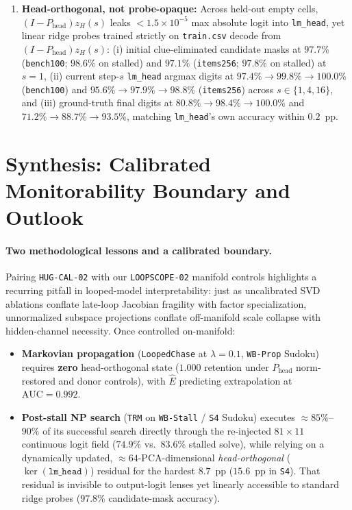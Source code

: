 \documentclass[10pt,letterpaper]{article}
\newcommand{\Phead}{P_{\mathrm{head}}}
\begin{document}
\begin{enumerate}[topsep=3pt,itemsep=2pt]
  \item \textbf{Head-orthogonal, not probe-opaque:} Across held-out empty cells, $(I-\Phead)z_H(s)$ leaks $< 1.5\times 10^{-5}$ max absolute logit into \texttt{lm\_head}, yet linear ridge probes trained strictly on \texttt{train.csv} decode from $(I-\Phead)z_H(s)$: (i) initial clue-eliminated candidate masks at $\mathbf{97.7\%}$ (\texttt{bench100}; $98.6\%$ on stalled) and $\mathbf{97.1\%}$ (\texttt{items256}; $97.8\%$ on stalled) at $s=1$, (ii) current step-$s$ \texttt{lm\_head} argmax digits at $97.4\% \to 99.8\% \to 100.0\%$ (\texttt{bench100}) and $95.6\% \to 97.9\% \to 98.8\%$ (\texttt{items256}) across $s \in \{1, 4, 16\}$, and (iii) ground-truth final digits at $80.8\% \to 98.4\% \to 100.0\%$ and $71.2\% \to 88.7\% \to 93.5\%$, matching \texttt{lm\_head}'s own accuracy within $0.2$~pp.
\end{enumerate}

\section{Synthesis: Calibrated Monitorability Boundary and Outlook}\label{sec:discussion}

\paragraph{Two methodological lessons and a calibrated boundary.} Pairing \texttt{HUG-CAL-02} with our \texttt{LOOPSCOPE-02} manifold controls highlights a recurring pitfall in looped-model interpretability: just as uncalibrated SVD ablations conflate late-loop Jacobian fragility with factor specialization, unnormalized subspace projections conflate off-manifold scale collapse with hidden-channel necessity. Once controlled on-manifold:
\begin{itemize}
  \item \textbf{Markovian propagation} (\texttt{LoopedChase} at $\lambda=0.1$, \texttt{WB-Prop} Sudoku) requires \textbf{zero} head-orthogonal state ($1.000$ retention under $\Phead$ norm-restored and donor controls), with $\hat{E}$ predicting extrapolation at $\mathrm{AUC}=0.992$.
  \item \textbf{Post-stall NP search} (\texttt{TRM} on \texttt{WB-Stall} / \texttt{S4} Sudoku) executes $\approx 85\%$--$90\%$ of its successful search directly through the re-injected $81\times 11$ continuous logit field ($74.9\%$ vs.\ $83.6\%$ stalled solve), while relying on a dynamically updated, $\approx 64$-PCA-dimensional \emph{head-orthogonal} ($\ker(\texttt{lm\_head})$) residual for the hardest $8.7$~pp ($15.6$~pp in \texttt{S4}). That residual is invisible to output-logit lenses yet linearly accessible to standard ridge probes ($97.8\%$ candidate-mask accuracy).
\end{itemize}
\end{document}

